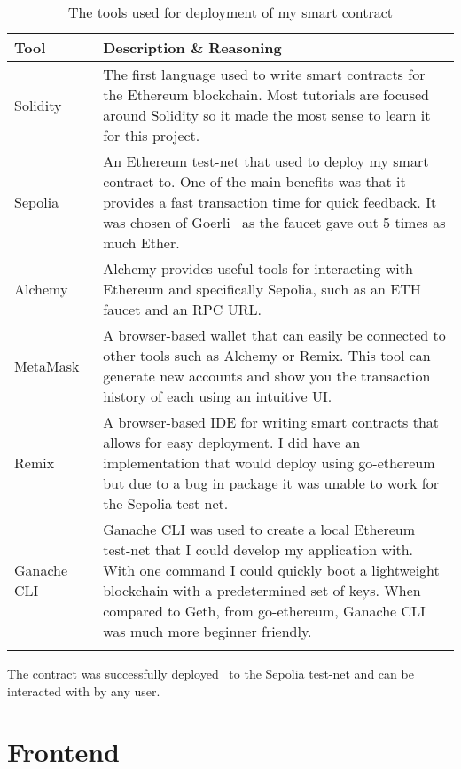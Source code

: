 \begin{longtable}{p{} p{}}
  \toprule
  \textbf{Tool} & \textbf{Description \& Reasoning}
  \\\midrule\midrule
  Solidity~\cite{noauthor_solidity_nodate}
  & \small The first language used to write smart contracts for the Ethereum blockchain. Most tutorials are focused around Solidity so it made the most sense to learn it for this project.\\
  Sepolia~\cite{noauthor_sepolia_nodate}
  & \small An Ethereum test-net that used to deploy my smart contract to. One of the main benefits was that it provides a fast transaction time for quick feedback. It was chosen of Goerli~\cite{noauthor_goerli_nodate} as the faucet gave out 5 times as much Ether.\\
  Alchemy~\cite{noauthor_alchemy_nodate}
  & \small Alchemy provides useful tools for interacting with Ethereum and specifically Sepolia, such as an ETH faucet and an RPC URL.\\
  MetaMask~\cite{noauthor_crypto_nodate}
  & \small A browser-based wallet that can easily be connected to other tools such as Alchemy or Remix. This tool can generate new accounts and show you the transaction history of each using an intuitive UI.\\
  Remix~\cite{noauthor_remix_nodate}
  & \small A browser-based IDE for writing smart contracts that allows for easy deployment. I did have an implementation that would deploy using go-ethereum but due to a bug in package it was unable to work for the Sepolia test-net.
  \\
  Ganache CLI~\cite{noauthor_trufflesuiteganache_2023}
  & Ganache CLI was used to create a local Ethereum test-net that I could develop my application with. With one command I could quickly boot a lightweight blockchain with a predetermined set of keys. When compared to Geth, from go-ethereum, Ganache CLI was much more beginner friendly. 
  \\\bottomrule\bottomrule
  \caption{The tools used for deployment of my smart contract}
  \label{tab:sc-tools}
\end{longtable}

\newparagraph
The contract was successfully deployed~\cite{etherscanio_library_nodate} to the Sepolia test-net and can be interacted with by any user.

\section{Frontend}

